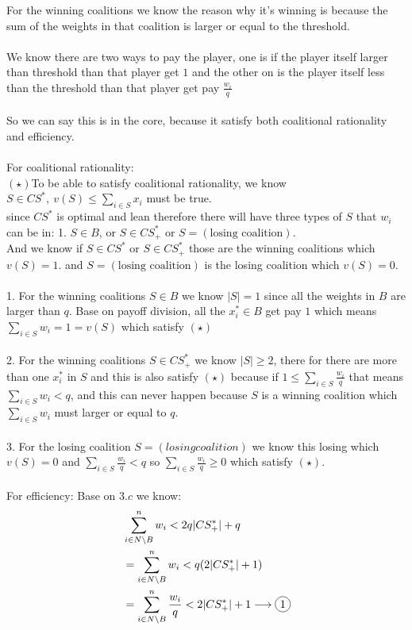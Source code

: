 \documentclass{article}
\newcommand*\circled[1]{\tikz[baseline=(char.base)]{
            \node[shape=circle,draw,inner sep=2pt] (char) {#1};}}
\begin{document}
For the winning coalitions we know the reason why it's winning is because the sum of the weights in that coalition is larger or equal to the threshold.\\\\
We know there are two ways to pay the player, one is if the player itself larger than threshold than that player get $1$ and the other on is the player itself less than the threshold than that player get pay $\frac{w_i}{q}$\\\\
So we can say this is in the core, because it satisfy both coalitional rationality and efficiency.\\\\
For coalitional rationality:\\
$(\star)$To be able to satisfy coalitional rationality, we know $S \in CS^*,\ v(S) \leq \sum_{i\in S} x_i$ must be true.\\
since $CS^*$ is optimal and lean therefore there will have three types of $S$ that $w_i$ can be in: 1. $S \in B$, or $S\in CS^*_+$ or $S = (\text{losing coalition})$.\\
And we know if $S \in CS^*$ or $S\in CS^*_+$ those are the winning coalitions which $v(S) = 1$.
and $S = (\text{losing coalition})$ is the losing coalition which $v(S) = 0$.\\\\
1. For the winning coalitions $S \in B$ we know $|S| = 1$ since all the weights in $B$ are larger than $q$. Base on payoff division, all the $x^*_i \in B$ get pay $1$ which means $\sum_{i \in S} w_i = 1 = v(S)$ which satisfy $(\star)$\\\\
2. For the winning coalitions $S \in CS^*_+$ we know $|S| \geq 2$, there for there are more than one $x^*_i$ in $S$ and this is also satisfy $(\star)$ because if $1 \leq \sum_{i \in S}\frac{w_i}{q}$ that means $\sum_{i \in S} w_i < q$, and this can never happen because $S$ is a winning coalition which $\sum_{i \in S} w_i$ must larger or equal to $q$.\\\\
3. For the losing coalition $S = (losing coalition)$ we know this losing which $v(S) = 0$ and $\sum_{i \in S} \frac{w_i}{q} < q$
so $\sum_{i \in S} \frac{w_i}{q} \geq 0$ which satisfy $(\star)$.\\\\
For efficiency:
Base on $3.c$ we know: 
\begin{align*}
&\sum_{i \in N\setminus B}^n w_i < 2q|CS^*_+| + q\\
&=\sum_{i \in N\setminus B}^n w_i < q(2|CS^*_+| + 1)\\
&=\sum_{i \in N\setminus B}^n \frac{w_i}{q} < 2|CS^*_+| + 1 \longrightarrow \circled{1}
\end{align*}
\end{document}

